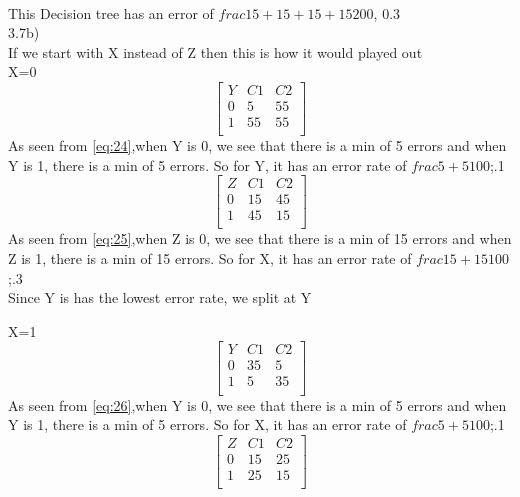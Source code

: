 \documentclass[12pt,english]{article}
\begin{document}
\\
This Decision tree has an error of $frac{15+15+15+15}{200}$, 0.3\\
3.7b)\\
If we start with X instead of Z then this is how it would played out\\
X=0\\
\begin{equation*}\tag{1}\label{eq:24}
\begin{bmatrix} Y & C1 & C2 \\0 & 5 &  55 \\1 & 55 &  55 \\ \end{bmatrix}
\end{equation*}
As seen from \eqref{eq:24},when Y is 0, we see that there is a min of 5 errors and when Y is 1, there is a min of 5 errors. So for Y, it has an error rate of $frac{5+5}{100}$;.1\\
\begin{equation*}\tag{2}\label{eq:25}
\begin{bmatrix} Z & C1 & C2 \\0 & 15 &  45 \\1 & 45 &  15 \\ \end{bmatrix}
\end{equation*}
As seen from \eqref{eq:25},when Z is 0, we see that there is a min of 15 errors and when Z is 1, there is a min of 15 errors. So for X, it has an error rate of $frac{15+15}{100}$;.3\\
Since Y is has the lowest error rate, we split at Y\par
X=1\\
\begin{equation*}\tag{1}\label{eq:26}
\begin{bmatrix} Y & C1 & C2 \\0 & 35 &  5 \\1 & 5 &  35 \\ \end{bmatrix}
\end{equation*}
As seen from \eqref{eq:26},when Y is 0, we see that there is a min of 5 errors and when Y is 1, there is a min of 5 errors. So for X, it has an error rate of $frac{5+5}{100}$;.1\\
\begin{equation*}\tag{2}\label{eq:27}
\begin{bmatrix} Z & C1 & C2 \\0 & 15 &  25 \\1 & 25 &  15 \\ \end{bmatrix}
\end{equation*}
\end{document}
